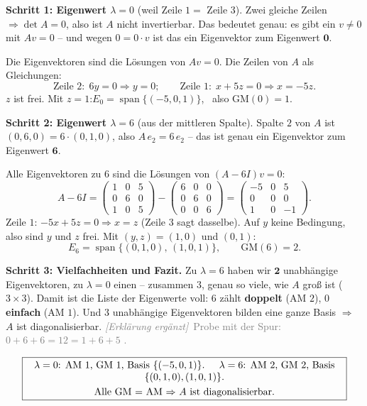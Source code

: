 \documentclass[a4paper,12pt]{article}
\newcommand{\erglerk}{\textcolor{gray}{\small\textit{[Erkl\"arung erg\"anzt]}}}
\begin{document}
\textbf{Schritt 1: Eigenwert $\lambda = 0$} (weil Zeile $1 =$ Zeile $3$). Zwei gleiche Zeilen $\Rightarrow \det A = 0$, also ist $A$ nicht invertierbar. Das bedeutet genau: es gibt ein $v \neq 0$ mit $Av = 0$ -- und wegen $0 = 0 \cdot v$ ist das ein Eigenvektor zum Eigenwert $\mathbf{0}$.

Die Eigenvektoren sind die L\"osungen von $Av = 0$. Die Zeilen von $A$ als Gleichungen:
\[
\text{Zeile 2:}\ \ 6y = 0 \Rightarrow y = 0; \qquad \text{Zeile 1:}\ \ x + 5z = 0 \Rightarrow x = -5z.
\]
$z$ ist frei. Mit $z = 1$:\quad $E_0 = \operatorname{span}\{(-5, 0, 1)\}$, \ also $\text{GM}(0) = 1$.

\textbf{Schritt 2: Eigenwert $\lambda = 6$} (aus der mittleren Spalte). Spalte $2$ von $A$ ist $(0,6,0) = 6\cdot(0,1,0)$, also $A\,e_2 = 6\,e_2$ -- das ist genau ein Eigenvektor zum Eigenwert $\mathbf{6}$.

Alle Eigenvektoren zu $6$ sind die L\"osungen von $(A - 6I)v = 0$:
\[
A - 6I = \begin{pmatrix} 1 & 0 & 5 \\ 0 & 6 & 0 \\ 1 & 0 & 5 \end{pmatrix} - \begin{pmatrix} 6 & 0 & 0 \\ 0 & 6 & 0 \\ 0 & 0 & 6 \end{pmatrix} = \begin{pmatrix} -5 & 0 & 5 \\ 0 & 0 & 0 \\ 1 & 0 & -1 \end{pmatrix}.
\]
Zeile $1$: $-5x + 5z = 0 \Rightarrow x = z$ (Zeile $3$ sagt dasselbe). Auf $y$ keine Bedingung, also sind $y$ und $z$ frei. Mit $(y,z) = (1,0)$ und $(0,1)$:
\[
E_6 = \operatorname{span}\{(0,1,0),\, (1,0,1)\}, \qquad \text{GM}(6) = 2.
\]

\textbf{Schritt 3: Vielfachheiten und Fazit.} Zu $\lambda = 6$ haben wir $\mathbf{2}$ unabh\"angige Eigenvektoren, zu $\lambda = 0$ einen -- zusammen $3$, genau so viele, wie $A$ gro\ss{} ist ($3\times3$). Damit ist die Liste der Eigenwerte voll: $6$ z\"ahlt \textbf{doppelt} (AM $2$), $0$ \textbf{einfach} (AM $1$). Und $3$ unabh\"angige Eigenvektoren bilden eine ganze Basis $\Rightarrow$ $A$ ist diagonalisierbar.
\erglerk\ \textcolor{gray}{\small Probe mit der Spur: $0 + 6 + 6 = 12 = 1+6+5$ \checkmark.}

\[
\fbox{\parbox{0.93\textwidth}{\centering
$\lambda = 0$: AM $1$, GM $1$, Basis $\{(-5,0,1)\}$. \quad
$\lambda = 6$: AM $2$, GM $2$, Basis $\{(0,1,0),(1,0,1)\}$. \\[3pt]
Alle GM $=$ AM $\Rightarrow$ $A$ ist diagonalisierbar.
}}
\]
\end{document}
